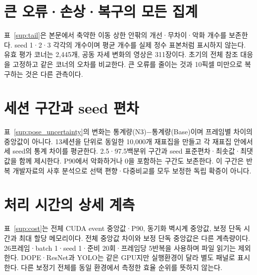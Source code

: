 \documentclass[journal,twoside,web]{ieeecolor}
\begin{document}
\section{큰 오류·손상·복구의 모든 집계}
표~\ref{sup:tail}은 본문에서 축약한 이동 상한 안팎의 개선·무차이·악화 개수를 보존한다. seed 1·2·3 각각의 개수이며 평균 개수를 실제 정수 표본처럼 표시하지 않는다. 유효 평가 코너는 2,445개, 공동 자세 변화의 영상은 311장이다. 초기의 전체 참조 대응을 고정하고 같은 코너의 오차를 비교한다. 큰 오류를 줄이는 것과 10픽셀 미만으로 복구하는 것은 다른 관측이다.


\section{세션 구간과 seed 편차}
표~\ref{sup:pose_uncertainty}의 변화는 통계량(N3)−통계량(Base)이며 프레임별 차이의 중앙값이 아니다. 13세션을 단위로 동일한 10,000개 재표집을 만들고 각 재표집 안에서 세 seed의 통계 차이를 평균한다. 2.5·97.5백분위 구간과 seed 표준편차·최솟값·최댓값을 함께 제시한다. P90에서 악화하거나 0을 포함하는 구간도 보존한다. 이 구간은 반복 개발자료의 사후 분석으로 선택 편향·다중비교를 모두 보정한 독립 확증이 아니다.


\section{처리 시간의 상세 계측}
표~\ref{sup:cost}는 전체 CUDA event 중앙값·P90, 동기화 벽시계 중앙값, 보정 단독 시간과 최대 할당 메모리이다. 전체 중앙값 차이와 보정 단독 중앙값은 다른 계측량이다. 26프레임·batch 1·seed 1·준비 20회·프레임당 5반복을 사용하며 파일 읽기는 제외한다. DOPE·ResNet과 YOLO는 같은 GPU지만 실행환경이 달라 별도 패널로 표시한다. 다른 보정기 전체를 동일 환경에서 측정한 효율 순위를 뜻하지 않는다.

\end{document}
